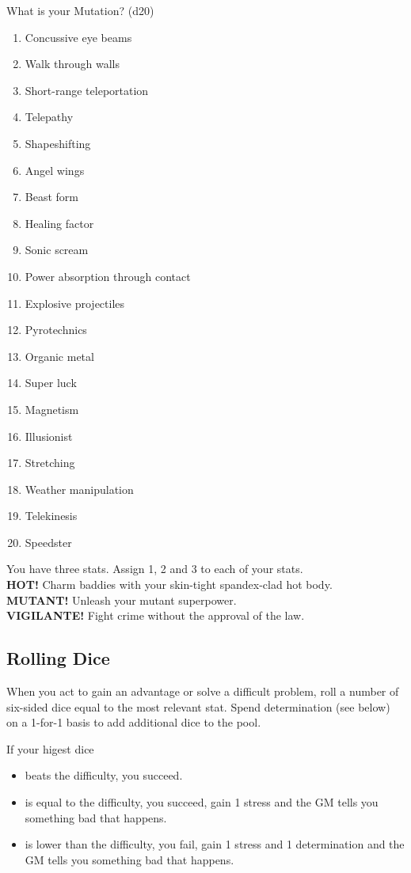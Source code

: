 \documentclass[twocolumn, 11pt
]{article}
\providecommand{\tightlist}{%
  \setlength{\itemsep}{0pt}\setlength{\parskip}{0pt}}
\begin{document}
\newpage

What is your Mutation? (d20)

\begin{enumerate}
\def\labelenumi{\arabic{enumi}.}
\tightlist
\item
  Concussive eye beams
\item
  Walk through walls
\item
  Short-range teleportation
\item
  Telepathy
\item
  Shapeshifting
\item
  Angel wings
\item
  Beast form
\item
  Healing factor
\item
  Sonic scream
\item
  Power absorption through contact
\item
  Explosive projectiles
\item
  Pyrotechnics
\item
  Organic metal
\item
  Super luck
\item
  Magnetism
\item
  Illusionist
\item
  Stretching
\item
  Weather manipulation
\item
  Telekinesis
\item
  Speedster
\end{enumerate}

You have three stats. Assign 1, 2 and 3 to each of your stats.\\
\textbf{HOT!} Charm baddies with your skin-tight spandex-clad hot
body.\\
\textbf{MUTANT!} Unleash your mutant superpower.\\
\textbf{VIGILANTE!} Fight crime without the approval of the law.

\newpage

\hypertarget{rolling-dice}{%
\subsection{Rolling Dice}\label{rolling-dice}}

When you act to gain an advantage or solve a difficult problem, roll a
number of six-sided dice equal to the most relevant stat. Spend
determination (see below) on a 1-for-1 basis to add additional dice to
the pool.

If your higest dice
\begin{itemize}	
\item beats the difficulty, you succeed.
\item is equal to the difficulty, you succeed, gain 1 stress and the GM tells you something
bad that happens. 
\item is lower than the difficulty, you fail, gain 1 stress and 1
determination and the GM tells you something bad that happens.
\end{itemize}
\end{document}
